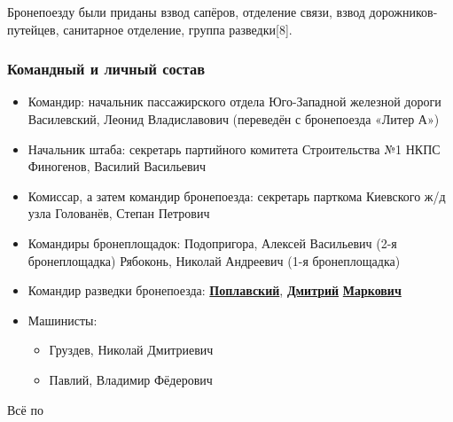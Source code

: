 \begin{multicols}{3}
Бронепоезду были приданы взвод сапёров, отделение связи, взвод
дорожников-путейцев, санитарное отделение, группа разведки[8]. 

\subsubsection{Командный и личный состав}

\def\sel#1{\underline{\textbf{#1}}}
\begin{itemize}
	 \item  Командир: начальник пассажирского отдела Юго-Западной железной дороги
					 Василевский, Леонид Владиславович (переведён с бронепоезда «Литер
								А»)

	 \item   Начальник штаба: секретарь партийного комитета Строительства №1 НКПС
					 Финогенов, Василий Васильевич

	 \item  Комиссар, а затем командир бронепоезда: секретарь парткома Киевского
					 ж/д узла Голованёв, Степан Петрович

	 \item  Командиры бронеплощадок: Подопригора, Алексей Васильевич (2-я
					 бронеплощадка) Рябоконь, Николай Андреевич (1-я бронеплощадка)
	\item   Командир разведки бронепоезда: 
					\sel{Поплавский}, \sel{Дмитрий} \sel{Маркович}
  \item Машинисты:
					\begin{itemize}
        \item Груздев, Николай Дмитриевич
        \item Павлий, Владимир Фёдерович
					\end{itemize}
\end{itemize}

Всё по\cite{Kajnaran2012} 

\end{multicols}
